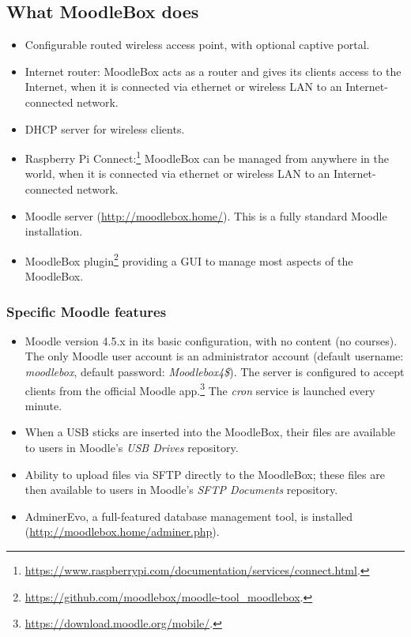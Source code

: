 \documentclass[12pt]{article}
\begin{document}
\subsection{What MoodleBox does}

\begin{itemize}
\item Configurable routed wireless access point, with optional captive portal.
\item Internet router: MoodleBox acts as a router and gives its clients access to the Internet, when it is connected via ethernet or wireless LAN to an Internet-connected network.
\item DHCP server for wireless clients.
\item Raspberry Pi Connect:\footnote{\url{https://www.raspberrypi.com/documentation/services/connect.html}.} MoodleBox can be managed from anywhere in the world, when it is connected via ethernet or wireless LAN to an Internet-connected network.
\item Moodle server (\url{http://moodlebox.home/}).
This is a fully standard Moodle installation.
\item MoodleBox plugin\footnote{\url{https://github.com/moodlebox/moodle-tool_moodlebox}.} providing a GUI to manage most aspects of the MoodleBox.
\end{itemize}

\subsubsection{Specific Moodle features}
\begin{itemize}
\item Moodle version 4.5.x in its basic configuration, with no content (no courses).
The only Moodle user account is an administrator account (default username: \emph{moodlebox}, default password: \emph{Moodlebox4\$}).
The server is configured to accept clients from the official Moodle app.\footnote{\url{https://download.moodle.org/mobile/}.}
The \textsl{cron} service is launched every minute.
\item When a USB sticks are inserted into the MoodleBox, their files are available to users in Moodle's \textsl{USB Drives} repository.
\item Ability to upload files via SFTP directly to the MoodleBox; these files are then available to users in Moodle's \textsl{SFTP Documents} repository.
\item AdminerEvo, a full-featured database management tool, is installed (\url{http://moodlebox.home/adminer.php}).
\end{itemize}
\end{document}
